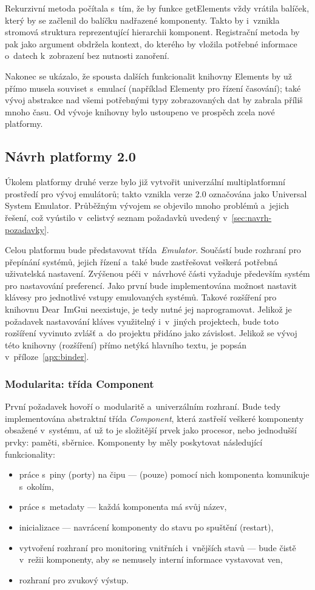 Rekurzivní metoda počítala s~tím, že by funkce getElements vždy vrátila balíček, který by se začlenil do balíčku nadřazené komponenty. Takto by i~vznikla stromová struktura reprezentující hierarchii komponent. Registrační metoda by pak jako argument obdržela kontext, do kterého by vložila potřebné informace o~datech k~zobrazení bez nutnosti zanoření.

Nakonec se ukázalo, že spousta dalších funkcionalit knihovny Elements by už přímo musela souviset s~emulací (například Elementy pro řízení časování); také vývoj abstrakce nad všemi potřebnými typy zobrazovaných dat by zabrala příliš mnoho času. Od vývoje knihovny bylo ustoupeno ve prospěch zcela nové platformy.

\subsection{Návrh platformy 2.0}
Úkolem platformy druhé verze bylo již vytvořit univerzální multiplatformní prostředí pro vývoj emulátorů; takto vznikla verze 2.0 označována jako Universal System Emulator. Průběžným vývojem se objevilo mnoho problémů a~jejich řešení, což vyústilo v~celistvý seznam požadavků uvedený v~\ref{sec:navrh-pozadavky}.

Celou platformu bude představovat třída~\emph{Emulator}. Součástí bude rozhraní pro přepínání systémů, jejich řízení a~také bude zastřešovat veškerá potřebná uživatelská nastavení. Zvýšenou péči v~návrhové části vyžaduje především systém pro nastavování preferencí. Jako první bude implementována možnost nastavit klávesy pro jednotlivé vstupy emulovaných systémů. Takové rozšíření pro knihovnu Dear~ImGui neexistuje, je tedy nutné jej naprogramovat. Jelikož je požadavek nastavování kláves využitelný i~v~jiných projektech, bude toto rozšíření vyvinuto zvlášť a~do projektu přidáno jako závislost. Jelikož se vývoj této knihovny (rozšíření) přímo netýká hlavního textu, je popsán v~příloze~\ref{apx:binder}.

\subsubsection{Modularita: třída Component}
První požadavek hovoří o~modularitě a~univerzálním rozhraní. Bude tedy implementována abstraktní třída \emph{Component}, která zastřeší veškeré komponenty obsažené v~systému, ať už to je složitější prvek jako procesor, nebo jednodušší prvky: paměti, sběrnice. Komponenty by měly poskytovat následující funkcionality:
\begin{itemize}
	\item práce s~piny (porty) na čipu --- (pouze) pomocí nich komponenta komunikuje s~okolím,
	\item práce s~metadaty --- každá komponenta má svůj název,
	\item inicializace --- navrácení komponenty do stavu po spuštění (restart),
	\item vytvoření rozhraní pro monitoring vnitřních i~vnějších stavů --- bude čistě v~režii komponenty, aby se nemusely interní informace vystavovat ven,
	\item rozhraní pro zvukový výstup.
\end{itemize}

